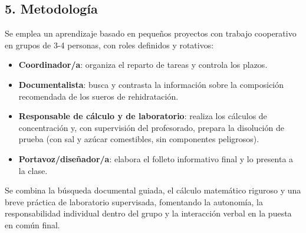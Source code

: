 \documentclass[11pt,a4paper]{article}
\begin{document}
\subsection*{5. Metodología}
Se emplea un aprendizaje basado en pequeños proyectos con trabajo cooperativo en grupos de 3-4 personas, con roles definidos y rotativos:
\begin{itemize}
    \item \textbf{Coordinador/a}: organiza el reparto de tareas y controla los plazos.
    \item \textbf{Documentalista}: busca y contrasta la información sobre la composición recomendada de los sueros de rehidratación.
    \item \textbf{Responsable de cálculo y de laboratorio}: realiza los cálculos de concentración y, con supervisión del profesorado, prepara la disolución de prueba (con sal y azúcar comestibles, sin componentes peligrosos).
    \item \textbf{Portavoz/diseñador/a}: elabora el folleto informativo final y lo presenta a la clase.
\end{itemize}
Se combina la búsqueda documental guiada, el cálculo matemático riguroso y una breve práctica de laboratorio supervisada, fomentando la autonomía, la responsabilidad individual dentro del grupo y la interacción verbal en la puesta en común final.
\end{document}
